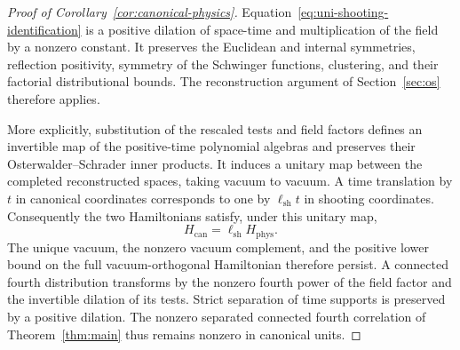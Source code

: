 \begin{proof}[Proof of Corollary~\ref{cor:canonical-physics}]
Equation~\eqref{eq:uni-shooting-identification} is a positive dilation
of space-time and multiplication of the field by a nonzero constant.
It preserves the Euclidean and internal symmetries, reflection
positivity, symmetry of the Schwinger functions, clustering, and their
factorial distributional bounds.  The reconstruction argument of
Section~\ref{sec:os} therefore applies.

More explicitly, substitution of the rescaled tests and field factors
defines an invertible map of the positive-time polynomial algebras and
preserves their Osterwalder--Schrader inner products.  It induces a
unitary map between the completed reconstructed spaces, taking vacuum
to vacuum.  A time translation by $t$ in canonical coordinates
corresponds to one by $\ell_{\mathrm{sh}}t$ in shooting coordinates.
Consequently the two Hamiltonians satisfy, under this unitary map,
\[
 H_{\mathrm{can}}=\ell_{\mathrm{sh}}H_{\mathrm{phys}}.
\]
The unique vacuum, the nonzero vacuum complement, and the positive
lower bound on the full vacuum-orthogonal Hamiltonian therefore persist.
A connected fourth distribution transforms by the nonzero fourth power
of the field factor and the invertible dilation of its tests.  Strict
separation of time supports is preserved by a positive dilation.
The nonzero separated connected fourth correlation of
Theorem~\ref{thm:main} thus remains nonzero in canonical units.
\end{proof}
